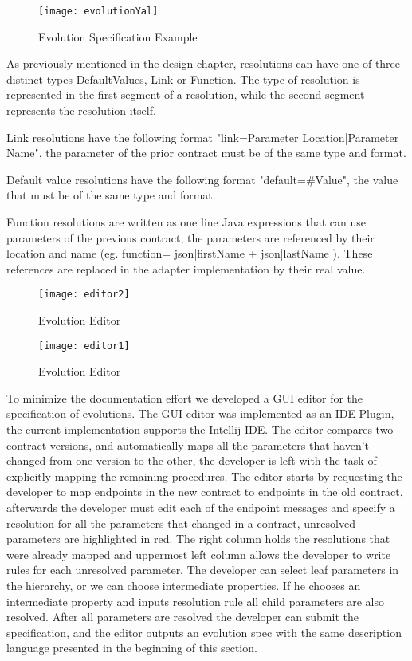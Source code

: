 \begin{figure}[htbp]
    \centering
    \texttt{[image: evolutionYal]}
    \caption{Evolution Specification Example}
    \label{fig:evolution_yal}
\end{figure}

As previously mentioned in the design chapter, resolutions can have one of three distinct types
DefaultValues, Link or Function.
The type of resolution is represented in the first segment of a resolution, while the second segment represents the resolution itself.

Link resolutions have the following format "link={Parameter Location}|{Parameter Name}", the parameter of the prior contract must be of the same type and format.

Default value resolutions have the following format "default=#Value", the value that must be of the same type and format.

Function resolutions are written as one line Java expressions that can use parameters of the previous contract, the
parameters are referenced by their location and name (eg. function= {{json|firstName}} + {{json|lastName}} ).
These references are replaced in the adapter implementation by their real value.

\newpage

\begin{figure}[htbp]
    \centering
    \texttt{[image: editor2]}
    \caption{Evolution Editor}
    \label{fig:editor2}
\end{figure}

\begin{figure}[htbp]
    \centering
    \texttt{[image: editor1]}
    \caption{Evolution Editor}
    \label{fig:editor1}
\end{figure}

To minimize the documentation effort we developed a GUI editor for the specification of evolutions.
The GUI editor was implemented as an IDE Plugin, the current implementation supports the Intellij IDE.
The editor compares two contract versions,
and automatically maps all the parameters that haven't changed from one version to the other, the
developer is left with the task of explicitly mapping the remaining procedures.
The editor starts by requesting the developer to map endpoints in the new contract to endpoints in the old contract,
afterwards the developer must edit each of the endpoint messages and specify a resolution for all the parameters that changed
in a contract, unresolved parameters are highlighted in red.
The right column holds the resolutions that were already mapped and uppermost left column allows the developer to write rules
for each unresolved parameter.
The developer can select leaf parameters in the hierarchy, or we can choose intermediate properties.
If he chooses an intermediate property and inputs resolution rule all child parameters are also resolved.
After all parameters are resolved the developer can submit the specification, and
the editor outputs an evolution spec with the same description language presented in the beginning of this section.

